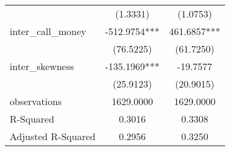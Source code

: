 \begin{tabular}{lcc}
                   & (1.3331)       & (1.0753)         \\
inter\_call\_money & -512.9754***   & 461.6857***      \\
                   & (76.5225)      & (61.7250)        \\
inter\_skewness    & -135.1969***   & -19.7577         \\
                   & (25.9123)      & (20.9015)        \\
observations       & 1629.0000      & 1629.0000        \\
R-Squared          & 0.3016         & 0.3308           \\
Adjusted R-Squared & 0.2956         & 0.3250           \\
\hline
\end{tabular}